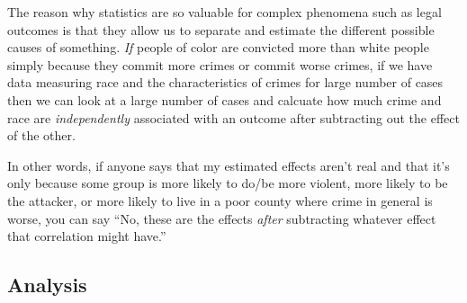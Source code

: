 \documentclass[12pt,article]{article}
\begin{document}
The reason why statistics are so valuable for complex phenomena such as
legal outcomes is that they allow us to separate and estimate the
different possible causes of something. \emph{If} people of color are
convicted more than white people simply because they commit more crimes
or commit worse crimes, if we have data measuring race and the
characteristics of crimes for large number of cases then we can look at
a large number of cases and calcuate how much crime and race are
\emph{independently} associated with an outcome after subtracting out
the effect of the other.

In other words, if anyone says that my estimated effects aren't real and
that it's only because some group is more likely to do/be more violent,
more likely to be the attacker, or more likely to live in a poor county
where crime in general is worse, you can say ``No, these are the effects
\emph{after} subtracting whatever effect that correlation might have.''

\subsection{Analysis}\label{analysis}

\singlespacing
\end{document}
